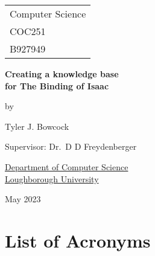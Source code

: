 \documentclass[a4paper]{report}
\begin{document}



\thispagestyle{empty}

\fancypage{}{\fbox}


\Large{
    \hfill \begin{tabular}{l}
        Computer Science \\
        COC251 \\
        B927949
    \end{tabular}
    }
    
    
    \begin{center}
\vspace*{\fill}

\Large{\textbf{Creating a knowledge base \\for The Binding of Isaac}}

\vspace*{\fill}

by

\vspace*{\fill}

Tyler J. Bowcock


\vspace*{\fill}
Supervisor: Dr.\ D D Freydenberger
\vspace*{\fill}

\underline{Department of Computer Science} \\
\underline{Loughborough University}

\vspace*{\fill}
May 2023

\end{center}


\newpage

\fancypage{}{}


\begin{abstract}
\end{abstract}

\tableofcontents

\chapter*{List of Acronyms}
\begin{acronym}
\end{acronym}
\end{document}
